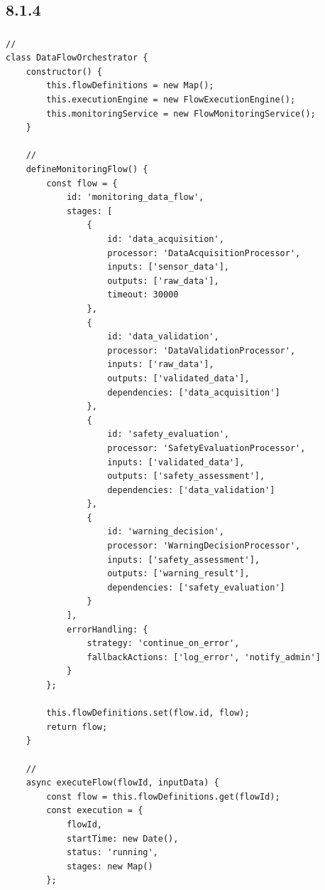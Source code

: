 \subsection{8.1.4}\label{section-14}

\subsubsection{}\label{section-15}

\begin{verbatim}
// 
class DataFlowOrchestrator {
    constructor() {
        this.flowDefinitions = new Map();
        this.executionEngine = new FlowExecutionEngine();
        this.monitoringService = new FlowMonitoringService();
    }
    
    // 
    defineMonitoringFlow() {
        const flow = {
            id: 'monitoring_data_flow',
            stages: [
                {
                    id: 'data_acquisition',
                    processor: 'DataAcquisitionProcessor',
                    inputs: ['sensor_data'],
                    outputs: ['raw_data'],
                    timeout: 30000
                },
                {
                    id: 'data_validation',
                    processor: 'DataValidationProcessor', 
                    inputs: ['raw_data'],
                    outputs: ['validated_data'],
                    dependencies: ['data_acquisition']
                },
                {
                    id: 'safety_evaluation',
                    processor: 'SafetyEvaluationProcessor',
                    inputs: ['validated_data'],
                    outputs: ['safety_assessment'],
                    dependencies: ['data_validation']
                },
                {
                    id: 'warning_decision',
                    processor: 'WarningDecisionProcessor',
                    inputs: ['safety_assessment'],
                    outputs: ['warning_result'],
                    dependencies: ['safety_evaluation']
                }
            ],
            errorHandling: {
                strategy: 'continue_on_error',
                fallbackActions: ['log_error', 'notify_admin']
            }
        };
        
        this.flowDefinitions.set(flow.id, flow);
        return flow;
    }
    
    // 
    async executeFlow(flowId, inputData) {
        const flow = this.flowDefinitions.get(flowId);
        const execution = {
            flowId,
            startTime: new Date(),
            status: 'running',
            stages: new Map()
        };
        

\end{verbatim}
